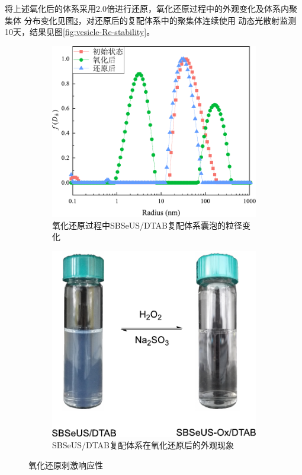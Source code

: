 \documentclass[bachelor,fandolfonts,replaceperiod]{jnuthesis}
\begin{document}
    将上述氧化后的体系采用2.0倍进行还原，氧化还原过程中的外观变化及体系内聚集体
    分布变化见图\ref{fig:SBSeUS/DTAB氧化还原刺激响应性}，对还原后的复配体系中的聚集体连续使用
    动态光散射监测10天，结果见图\ref{fig:vesicle-Re-stability}。
    \begin{figure}[htbp]
        \begin{subfigure}[]{.5\textwidth}
            \centering
            \includegraphics[width=.98\textwidth]{figure/SBSeUS-redox-radius.pdf}
            \caption{氧化还原过程中SBSeUS/DTAB复配体系囊泡的粒径变化}\label{fig:SBSeUS-redox-radius}
        \end{subfigure}%
        \begin{subfigure}[]{.5\textwidth}
            \centering
            \includegraphics[width=.8\textwidth]{figure/scheme-SBSeUS-redox.pdf}
            \caption{SBSeUS/DTAB复配体系在氧化还原后的外观现象}\label{fig:scheme-SBSeUS-redox}
        \end{subfigure}%
        \caption{氧化还原刺激响应性}
        \label{fig:SBSeUS/DTAB氧化还原刺激响应性}
    \end{figure}
    
\end{document}
